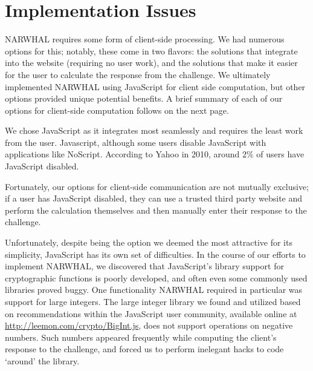 \documentclass[11pt]{article}
\begin{document}
\section{Implementation Issues}
NARWHAL requires some form of client-side processing. We had numerous options for this; notably, these come in two flavors: the solutions that integrate into the website (requiring no user work), and the solutions that make it easier for the user to calculate the response from the challenge. We ultimately implemented NARWHAL using JavaScript for client side computation, but other options provided unique potential benefits. A brief summary of each of our options for client-side computation follows on the next page.

We chose JavaScript as it integrates most seamlessly and requires the least work from the user. Javascript, although some users disable JavaScript with applications like NoScript. According to Yahoo in 2010, around $2\%$ of users have JavaScript disabled. \cite{Zakas}

Fortunately, our options for client-side communication are not mutually exclusive; if a user has JavaScript disabled, they can use a trusted third party website and perform the calculation themselves and then manually enter their response to the challenge.

Unfortunately, despite being the option we deemed the most attractive for its simplicity, JavaScript has its own set of difficulties.  In the course of our efforts to implement NARWHAL, we discovered that JavaScript's library support for cryptographic functions is poorly developed, and often even some commonly used libraries proved buggy.  One functionality NARWHAL required in particular was support for large integers.  The large integer library we found and utilized based on recommendations within the JavaScript user community, available online at \url{http://leemon.com/crypto/BigInt.js}, does not support operations on negative numbers.  Such numbers appeared frequently while computing the client's response to the challenge, and forced us to perform inelegant hacks to code ‘around' the library.
\end{document}
